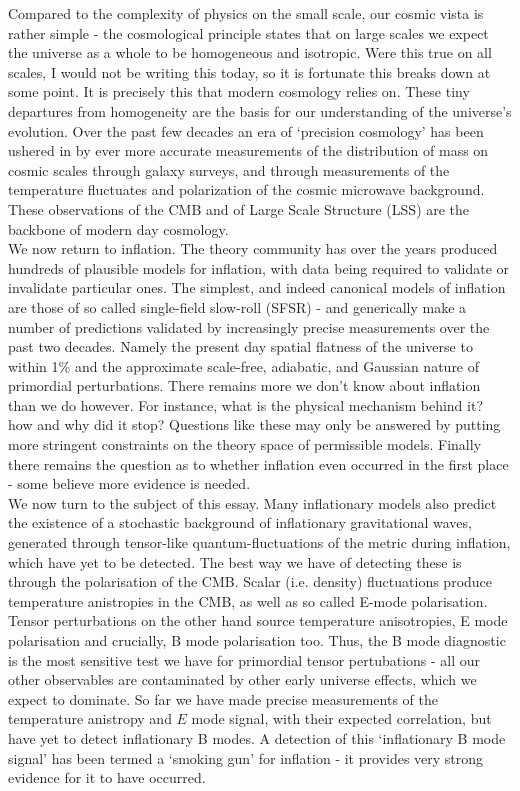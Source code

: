 \documentclass[a4paper,10pt]{article}
\begin{document}
Compared to the complexity of physics on the small scale, our cosmic vista is rather simple - the cosmological principle states that on large scales we expect the universe as a whole to be homogeneous and isotropic. Were this true on all scales, I would not be writing this today, so it is fortunate this breaks down at some point. It is precisely this that modern cosmology relies on. These tiny departures from homogeneity are the basis for our understanding of the universe's evolution. Over the past few decades an era of `precision cosmology' has been ushered in by ever more accurate measurements of the distribution of mass on cosmic scales through galaxy surveys, and through measurements of the temperature fluctuates and polarization of the cosmic microwave background. These observations of the CMB and of Large Scale Structure (LSS) are the backbone of modern day cosmology.\\

We now return to inflation. The theory community has over the years produced hundreds of plausible models for inflation, with data being required to validate or invalidate particular ones. The simplest, and indeed canonical models of inflation are those of so called single-field slow-roll (SFSR) - and generically make a number of predictions validated by increasingly precise measurements over the past two decades. Namely the present day spatial flatness of the universe to within 1\% and the approximate scale-free, adiabatic, and Gaussian nature of primordial perturbations. There remains more we don't know about inflation than we do however. For instance, what is the physical mechanism behind it? how and why did it stop? Questions like these may only be answered by putting more stringent constraints on the theory space of permissible models. Finally there remains the question as to whether inflation even occurred in the first place - some believe more evidence is needed.\\

We now turn to the subject of this essay. Many inflationary models also predict the existence of a stochastic background of inflationary gravitational waves, generated through tensor-like quantum-fluctuations of the metric during inflation, which have yet to be detected. The best way we have of detecting these is through the polarisation of the CMB. Scalar (i.e. density) fluctuations produce temperature anistropies in the CMB, as well as so called E-mode polarisation. Tensor perturbations on the other hand source temperature anisotropies, E mode polarisation and crucially, B mode polarisation too. Thus, the B mode diagnostic is the most sensitive test we have for primordial tensor pertubations - all our other observables are contaminated by other early universe effects, which we expect to dominate. So far we have made precise measurements of the temperature anistropy and $E$ mode signal, with their expected correlation, but have yet to detect inflationary B modes. A detection of this `inflationary B mode signal' has been termed a `smoking gun' for inflation - it provides very strong evidence for it to have occurred.\\
\end{document}
